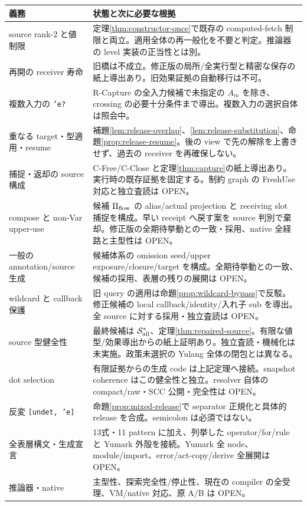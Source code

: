 \documentclass[11pt,a4paper]{article}
\newcommand{\Src}{\mathcal S}
\begin{document}
\begin{longtable}{>{\raggedright\arraybackslash}p{}>{\raggedright\arraybackslash}p{}}
\toprule 義務 & 状態と次に必要な根拠 \\
\midrule\endhead
source rank-2 と値制限 & 定理\ref{thm:constructor-once}で既存の computed-fetch 制限と両立。適用全体の再一般化を不要と判定。推論器の level 実装の正当性とは別。\\
再開の receiver 寿命 & 旧橋は不成立。修正版の局所/全実行型と精密な保存の紙上導出あり。旧効果証拠の自動移行は不可。\\
複数入力の \texttt{'e?} & R-Capture の全入力候補で未指定の \(A_m\) を除き、crossing の必要十分条件まで導出。複数入力の選択自体は照会中。\\
重なる target・型適用・resume & 補題\ref{lem:release-overlap}、\ref{lem:release-substitution}、命題\ref{prop:release-resume}。後の view で先の解除を上書きせず、過去の receiver を再確保しない。\\
捕捉・返却の source 構成 & C-Free/C-Close と定理\ref{thm:capture}の紙上導出あり。実行時の既存証拠を固定する。制約 graph の FreshUse 対応と独立査読は OPEN。\\
compose と non-Var upper-use & 候補 \(\Pi_{\rm flow}\) の alias/actual projection と receiving slot 捕捉を構成。早い receipt へ戻す案を source 判別で棄却。修正版の全期待挙動との一致・採用、native 全経路と主型性は OPEN。\\
一般の annotation/source 生成 & 候補体系の omission seed/upper exposure/closure/target を構成。全期待挙動との一致、候補の採用、表層の残りの展開は OPEN。\\
wildcard と callback 保護 & 旧 query の適用は命題\ref{prop:wildcard-bypass}で反駁。修正候補の local callback/identity/入れ子 sub を導出。全 source に対する採用・独立査読は OPEN。\\
source 型健全性 & 最終候補は \(\Src^*_{\rm all}\)、定理\ref{thm:repaired-source}。有限な値型/効果導出からの紙上証明あり。独立査読・機械化は未実施。政策未選択の Yulang 全体の閉包とは異なる。\\
dot selection & 有限証拠からの生成 code は上記定理へ接続。snapshot coherence はこの健全性と独立。resolver 自体の compact/raw・SCC 公開・完全性は OPEN。\\
反変 \texttt{[undet, 'e]} & 命題\ref{prop:mixed-release}で separator 正規化と具体的 release を合成。semicolon は必須ではない。\\
全表層構文・生成宣言 & 13式・11 pattern に加え、列挙した operator/for/rule と Yumark 外殻を接続。Yumark 全 node、module/import、error/act-copy/derive 全展開は OPEN。\\
推論器・native & 主型性、探索完全性/停止性、現在の compiler の全受理、VM/native 対応、原 A/B は OPEN。\\
\bottomrule
\end{longtable}
\end{document}
